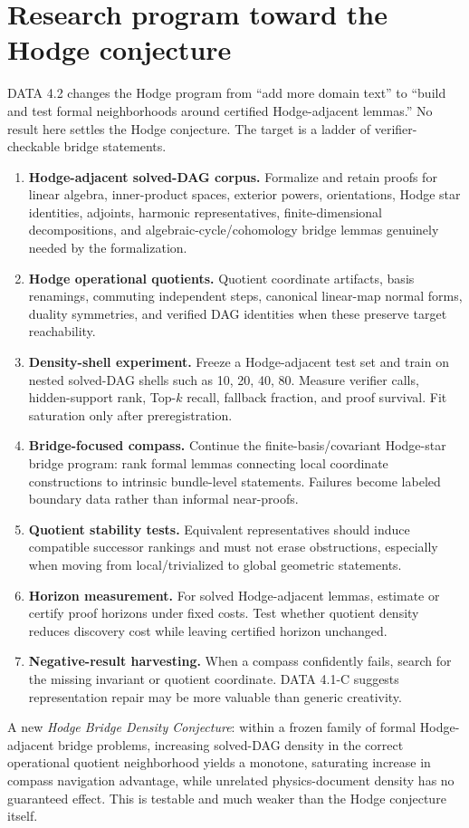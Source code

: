 \documentclass[11pt]{article}
\begin{document}
\section{Research program toward the Hodge conjecture}
DATA 4.2 changes the Hodge program from ``add more domain text'' to ``build and test formal neighborhoods around certified Hodge-adjacent lemmas.'' No result here settles the Hodge conjecture. The target is a ladder of verifier-checkable bridge statements.
\begin{enumerate}[leftmargin=2.2em]
\item \textbf{Hodge-adjacent solved-DAG corpus.} Formalize and retain proofs for linear algebra, inner-product spaces, exterior powers, orientations, Hodge star identities, adjoints, harmonic representatives, finite-dimensional decompositions, and algebraic-cycle/cohomology bridge lemmas genuinely needed by the formalization.
\item \textbf{Hodge operational quotients.} Quotient coordinate artifacts, basis renamings, commuting independent steps, canonical linear-map normal forms, duality symmetries, and verified DAG identities when these preserve target reachability.
\item \textbf{Density-shell experiment.} Freeze a Hodge-adjacent test set and train on nested solved-DAG shells such as 10, 20, 40, 80. Measure verifier calls, hidden-support rank, Top-$k$ recall, fallback fraction, and proof survival. Fit saturation only after preregistration.
\item \textbf{Bridge-focused compass.} Continue the finite-basis/covariant Hodge-star bridge program: rank formal lemmas connecting local coordinate constructions to intrinsic bundle-level statements. Failures become labeled boundary data rather than informal near-proofs.
\item \textbf{Quotient stability tests.} Equivalent representatives should induce compatible successor rankings and must not erase obstructions, especially when moving from local/trivialized to global geometric statements.
\item \textbf{Horizon measurement.} For solved Hodge-adjacent lemmas, estimate or certify proof horizons under fixed costs. Test whether quotient density reduces discovery cost while leaving certified horizon unchanged.
\item \textbf{Negative-result harvesting.} When a compass confidently fails, search for the missing invariant or quotient coordinate. DATA 4.1-C suggests representation repair may be more valuable than generic creativity.
\end{enumerate}
A new \emph{Hodge Bridge Density Conjecture}: within a frozen family of formal Hodge-adjacent bridge problems, increasing solved-DAG density in the correct operational quotient neighborhood yields a monotone, saturating increase in compass navigation advantage, while unrelated physics-document density has no guaranteed effect. This is testable and much weaker than the Hodge conjecture itself.
\end{document}
